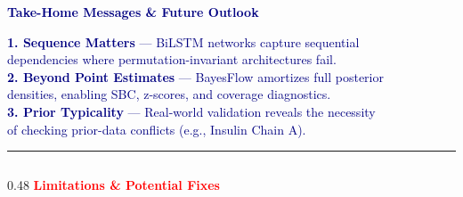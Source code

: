 \documentclass[aspectratio=169,10pt]{beamer}
\begin{document}
\begin{frame}[plain]

\vspace{0.16cm}
\hspace{0.30cm}
\begin{minipage}{0.92\textwidth}

{\large\textbf{\textcolor{navy}{Take-Home Messages \& Future Outlook}}}

\vspace{0.12cm}

{\fontsize{8.0}{9.5}\selectfont
\textcolor{navy}{
\textbf{1. Sequence Matters} — BiLSTM networks capture sequential\\
\hspace{0.8em}dependencies where permutation-invariant architectures fail.\\[6pt]
\textbf{2. Beyond Point Estimates} — BayesFlow amortizes full posterior\\
\hspace{0.8em}densities, enabling SBC, z-scores, and coverage diagnostics.\\[6pt]
\textbf{3. Prior Typicality} — Real-world validation reveals the necessity\\
\hspace{0.8em}of checking prior-data conflicts (e.g., Insulin Chain A).
}}

\vspace{0.24cm}
\hrule
\vspace{0.40cm}

\begin{columns}[T,totalwidth=\textwidth]

\begin{column}{0.48\textwidth}
{\fontsize{9.0}{10.5}\selectfont
\textbf{\textcolor{red}{Limitations \& Potential Fixes}}
}

\vspace{0.15cm}

\end{column}


\end{columns}
\end{minipage}
\end{frame}
\end{document}
